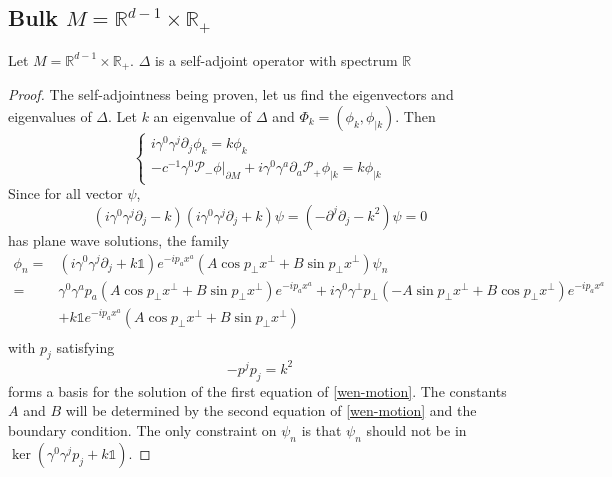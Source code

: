 \subsection{Bulk $M = \mathbb{R}^{d-1} \times \mathbb{R}_+$}
\begin{proposition}
Let $M = \mathbb{R}^{d-1} \times \mathbb{R}_+$. $\Delta$ is a self-adjoint operator with spectrum $\mathbb{R}$
\end{proposition}
\begin{proof}
The self-adjointness being proven, let us find the eigenvectors and eigenvalues of $\Delta$. Let $k$ an eigenvalue of $\Delta$ and $\Phi_k = (\phi_k, \phi_{| k})$. Then
\begin{equation}\label{wen-motion2}
\begin{cases}
i \gamma^0 \gamma^j \partial_j \phi_k = k \phi_k \\
-c^{-1} \gamma^0 \mathcal{P}_- \phi\vert_{\partial M} + i \gamma^0 \gamma^a \partial_a \mathcal{P}_+ \phi_{| k} = k \phi_{| k}
\end{cases}
\end{equation}
Since for all vector $\psi$,
\begin{equation*}
(i\gamma^0 \gamma^j\partial_j - k )(i\gamma^0 \gamma^j\partial_j + k )\psi = 
(- \partial^j\partial_j - k^2) \psi = 0
\end{equation*}
has plane wave solutions, 
the family
\begin{equation*}
\begin{split}
\phi_n = & (i\gamma^0\gamma^j\partial_j + k \mathbb{1}) e^{-ip_a x^a }(A\cos p_\bot x^\bot + B \sin p_\bot x^\bot) \psi_n \\
 = &\gamma^0\gamma^a p_a (A \cos p_\bot x^\bot + B \sin p_\bot x^\bot)e^{-ip_a x^a}
+ i\gamma^0\gamma^\bot p_\bot (-A \sin p_\bot x^\bot + B \cos p_\bot x^\bot) e^{-ip_a x^a} \\
& + k \mathbb{1} e^{-ip_a x^a}(A\cos p_\bot x^\bot + B \sin p_\bot x^\bot)  \\
\end{split}
\end{equation*}
with $p_j$ satisfying
\begin{equation*}
- p^j p_j = k^2
\end{equation*}
forms a basis for the solution of the first equation of \cref{wen-motion}. 
The constants $A$ and $B$ will be determined by the second equation of \cref{wen-motion} and the boundary condition. 
The only constraint on $\psi_n$ is that $\psi_n$ should not be in $\ker( \gamma^0 \gamma^j p_j + k \mathbb{1})$. 

\end{proof}
